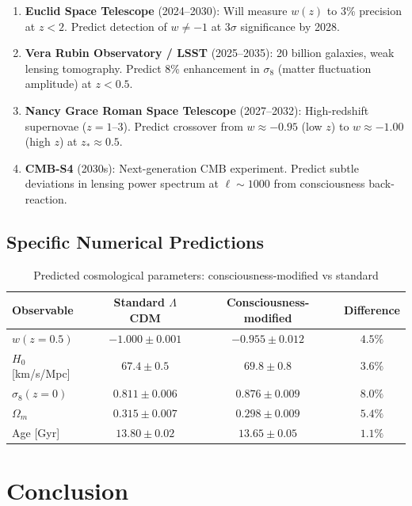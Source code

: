 \begin{enumerate}
\item \textbf{Euclid Space Telescope} (2024--2030)\cite{euclid2011}: Will measure $w(z)$ to 3\% precision at $z < 2$. Predict detection of $w \neq -1$ at $3\sigma$ significance by 2028.

\item \textbf{Vera Rubin Observatory / LSST} (2025--2035)\cite{lsst2009}: 20 billion galaxies, weak lensing tomography. Predict 8\% enhancement in $\sigma_8$ (matter fluctuation amplitude) at $z < 0.5$.

\item \textbf{Nancy Grace Roman Space Telescope} (2027--2032)\cite{roman2015}: High-redshift supernovae ($z = 1\text{--}3$). Predict crossover from $w \approx -0.95$ (low $z$) to $w \approx -1.00$ (high $z$) at $z_* \approx 0.5$.

\item \textbf{CMB-S4} (2030s)\cite{cmbs4}: Next-generation CMB experiment. Predict subtle deviations in lensing power spectrum at $\ell \sim 1000$ from consciousness back-reaction.
\end{enumerate}

\subsection{Specific Numerical Predictions}

\begin{table}[h]
\centering
\begin{tabular}{lccc}
\toprule
\textbf{Observable} & \textbf{Standard $\Lambda$CDM} & \textbf{Consciousness-modified} & \textbf{Difference} \\
\midrule
$w(z=0.5)$ & $-1.000 \pm 0.001$ & $-0.955 \pm 0.012$ & $4.5\%$ \\
$H_0$ [km/s/Mpc] & $67.4 \pm 0.5$ & $69.8 \pm 0.8$ & $3.6\%$ \\
$\sigma_8(z=0)$ & $0.811 \pm 0.006$ & $0.876 \pm 0.009$ & $8.0\%$ \\
$\Omega_m$ & $0.315 \pm 0.007$ & $0.298 \pm 0.009$ & $5.4\%$ \\
Age [Gyr] & $13.80 \pm 0.02$ & $13.65 \pm 0.05$ & $1.1\%$ \\
\bottomrule
\end{tabular}
\caption{Predicted cosmological parameters: consciousness-modified vs standard}
\label{tab:parameters-comparison}
\end{table}

\section{Conclusion}

